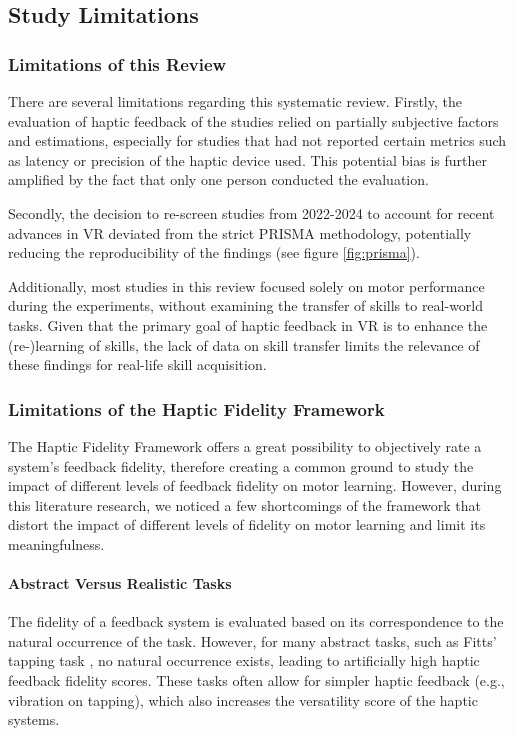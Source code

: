 \subsection{Study Limitations}

\subsubsection{Limitations of this Review}
There are several limitations regarding this systematic review.
Firstly, the evaluation of haptic feedback of the studies relied on partially subjective factors and estimations, especially for studies that had not reported certain metrics such as latency or precision of the haptic device used. This potential bias is further amplified by the fact that only one person conducted the evaluation.

Secondly, the decision to re-screen studies from 2022-2024 to account for recent advances in VR deviated from the strict PRISMA methodology, potentially reducing the reproducibility of the findings (see figure \ref{fig:prisma}).

Additionally, most studies in this review focused solely on motor performance during the experiments, without examining the transfer of skills to real-world tasks. Given that the primary goal of haptic feedback in VR is to enhance the (re-)learning of skills, the lack of data on skill transfer limits the relevance of these findings for real-life skill acquisition.


\subsubsection{Limitations of the Haptic Fidelity Framework}
The Haptic Fidelity Framework offers a great possibility to objectively rate a system's feedback fidelity, therefore creating a common ground to study the impact of different levels of feedback fidelity on motor learning. However, during this literature research, we noticed a few shortcomings of the framework that distort the impact of different levels of fidelity on motor learning and limit its meaningfulness.

\paragraph{Abstract Versus Realistic Tasks}
The fidelity of a feedback system is evaluated based on its correspondence to the natural occurrence of the task. However, for many abstract tasks, such as Fitts' tapping task \cite{Fitts1954TheMovement}, no natural occurrence exists, leading to artificially high haptic feedback fidelity scores. These tasks often allow for simpler haptic feedback (e.g., vibration on tapping), which also increases the versatility score of the haptic systems. 

